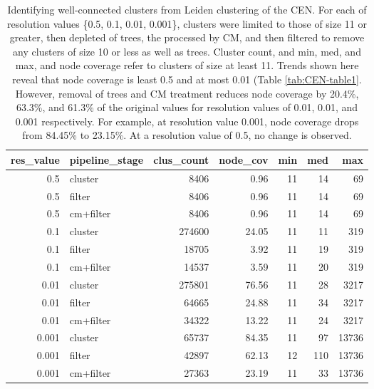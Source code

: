 \documentclass[11pt]{article}   	%
\begin{document}
\begin{table}[ht]
\centering
\begin{tabular}{rlrrrrr}
  \hline
res\_value & pipeline\_stage & clus\_count & node\_cov & min & med & max \\
  \hline
0.5 & cluster &  8406 & 0.96 &    11 & 14 &    69 \\
  0.5 & filter &  8406 & 0.96 &    11 & 14 &    69 \\
  0.5 & cm+filter &  8406 & 0.96 &    11 & 14 &    69 \\
  \hline
  0.1 & cluster & 274600 & 24.05 &    11 & 11 &   319 \\
  0.1 & filter & 18705 & 3.92 &    11 & 19 &   319 \\
  0.1 & cm+filter & 14537 & 3.59 &    11 & 20 &   319 \\
  \hline
  0.01 & cluster & 275801 & 76.56 &    11 & 28 &  3217 \\
  0.01 & filter & 64665 & 24.88 &    11 & 34 &  3217 \\
  0.01 & cm+filter & 34322 & 13.22 &    11 & 24 &  3217 \\
  \hline
  0.001 & cluster & 65737 & 84.35 &    11 & 97 & 13736 \\
  0.001 & filter & 42897 & 62.13 &    12 & 110 & 13736 \\
  0.001 & cm+filter & 27363 & 23.19 &    11 & 33 & 13736 \\
   \hline
\end{tabular}
\caption{Identifying well-connected clusters from Leiden clustering of the CEN. For each of resolution values \{0.5, 0.1, 0.01, 0.001\}, clusters were limited to those of size 11 or greater, then depleted of trees, the processed by CM, and then filtered to remove any clusters of size 10 or less as well as trees. Cluster count, and min, med, and max, and node coverage refer to clusters of size at least 11.
Trends shown here reveal that node coverage is least 0.5 and at most  0.01 (Table \ref{tab:CEN-table1}. However, removal of trees and CM treatment reduces node coverage by 20.4\%, 63.3\%, and 61.3\% of the original values for resolution values of 0.01, 0.01, and 0.001 respectively.  For example, at resolution value 0.001, node coverage drops from 84.45\% to 23.15\%. At a resolution value of 0.5, no change is observed.}
\label{tab:CEN-Leiden-11-CM}
\end{table}
\end{document}
